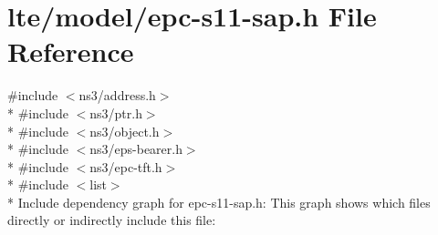 \hypertarget{epc-s11-sap_8h}{}\section{lte/model/epc-\/s11-\/sap.h File Reference}
\label{epc-s11-sap_8h}
{\ttfamily \#include $<$ns3/address.\+h$>$}\\*
{\ttfamily \#include $<$ns3/ptr.\+h$>$}\\*
{\ttfamily \#include $<$ns3/object.\+h$>$}\\*
{\ttfamily \#include $<$ns3/eps-\/bearer.\+h$>$}\\*
{\ttfamily \#include $<$ns3/epc-\/tft.\+h$>$}\\*
{\ttfamily \#include $<$list$>$}\\*
Include dependency graph for epc-\/s11-\/sap.h\+:
This graph shows which files directly or indirectly include this file\+:
